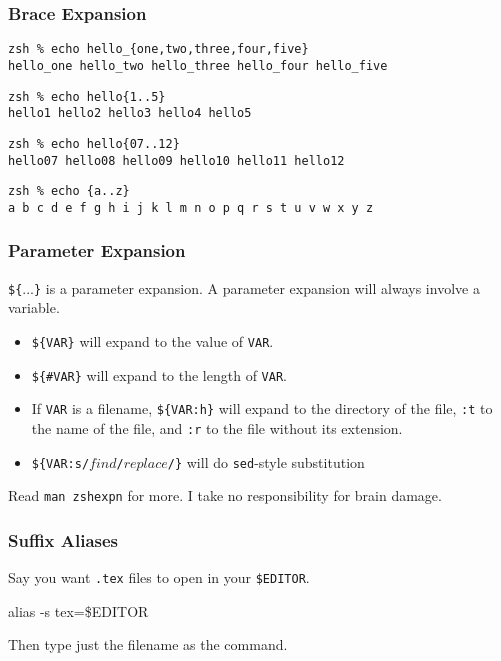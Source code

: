 \documentclass{beamer}
\begin{document}
\begin{frame}[fragile]
    \frametitle{Brace Expansion}
    \begin{verbatim}zsh % echo hello_{one,two,three,four,five}
hello_one hello_two hello_three hello_four hello_five\end{verbatim}
\pause

    \begin{verbatim}zsh % echo hello{1..5}
hello1 hello2 hello3 hello4 hello5\end{verbatim}
\pause

    \begin{verbatim}zsh % echo hello{07..12}
hello07 hello08 hello09 hello10 hello11 hello12\end{verbatim}
\pause

    \begin{verbatim}zsh % echo {a..z}
a b c d e f g h i j k l m n o p q r s t u v w x y z\end{verbatim}
\end{frame}

\begin{frame}
    \frametitle{Parameter Expansion}
    \texttt{\$\{}...\texttt{\}} is a parameter expansion. A parameter expansion
    will always involve a variable.
    \begin{itemize}[<+->]
        \item \texttt{\$\{VAR\}} will expand to the value of \texttt{VAR}.
        \item \texttt{\$\{\#VAR\}} will expand to the length of \texttt{VAR}.
        \item If \texttt{VAR} is a filename, \texttt{\$\{VAR:h\}} will expand
            to the directory of the file, \texttt{:t} to the name of the file,
            and \texttt{:r} to the file without its extension.
        \item \texttt{\$\{VAR:s/$find$/$replace$/\}} will do \texttt{sed}-style
            substitution
    \end{itemize}

    \pause

    Read \texttt{man zshexpn} for more. I take no responsibility for brain
    damage.
\end{frame}

\begin{frame}
    \frametitle{Suffix Aliases}
    \centering
    Say you want \texttt{.tex} files to open in your \texttt{\$EDITOR}.

    \medskip
    {\Large\ttfamily alias -s tex=\$EDITOR\par}
    \medskip

    Then type just the filename as the command.
\end{frame}
\end{document}
